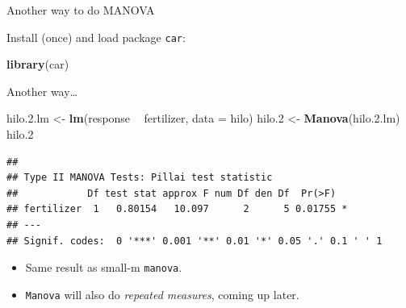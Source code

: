 \documentclass[
  ignorenonframetext,
]{beamer}
\newenvironment{Shaded}{\begin{snugshade}}{\end{snugshade}}
\newcommand{\DataTypeTok}[1]{\textcolor[rgb]{0.13,0.29,0.53}{#1}}
\newcommand{\FloatTok}[1]{\textcolor[rgb]{0.00,0.00,0.81}{#1}}
\newcommand{\KeywordTok}[1]{\textcolor[rgb]{0.13,0.29,0.53}{\textbf{#1}}}
\newcommand{\NormalTok}[1]{#1}
\newcommand{\OperatorTok}[1]{\textcolor[rgb]{0.81,0.36,0.00}{\textbf{#1}}}
\newcommand{\StringTok}[1]{\textcolor[rgb]{0.31,0.60,0.02}{#1}}
\begin{document}
\begin{frame}[fragile]{Another way to do MANOVA}
\protect\hypertarget{another-way-to-do-manova}{}

Install (once) and load package \texttt{car}:

\begin{Shaded}
\begin{Highlighting}[]
\KeywordTok{library}\NormalTok{(car)}
\end{Highlighting}
\end{Shaded}

\end{frame}

\begin{frame}[fragile]{Another way\ldots}
\protect\hypertarget{another-way-1}{}

\begin{Shaded}
\begin{Highlighting}[]
\NormalTok{hilo.}\FloatTok{2.}\NormalTok{lm <-}\StringTok{ }\KeywordTok{lm}\NormalTok{(response }\OperatorTok{~}\StringTok{ }\NormalTok{fertilizer, }\DataTypeTok{data =}\NormalTok{ hilo)}
\NormalTok{hilo}\FloatTok{.2}\NormalTok{ <-}\StringTok{ }\KeywordTok{Manova}\NormalTok{(hilo.}\FloatTok{2.}\NormalTok{lm)}
\NormalTok{hilo}\FloatTok{.2}
\end{Highlighting}
\end{Shaded}

\begin{verbatim}
## 
## Type II MANOVA Tests: Pillai test statistic
##            Df test stat approx F num Df den Df  Pr(>F)  
## fertilizer  1   0.80154   10.097      2      5 0.01755 *
## ---
## Signif. codes:  0 '***' 0.001 '**' 0.01 '*' 0.05 '.' 0.1 ' ' 1
\end{verbatim}

\begin{itemize}
\item
  Same result as small-m \texttt{manova}.
\item
  \texttt{Manova} will also do \emph{repeated measures}, coming up
  later.
\end{itemize}

\end{frame}
\end{document}
